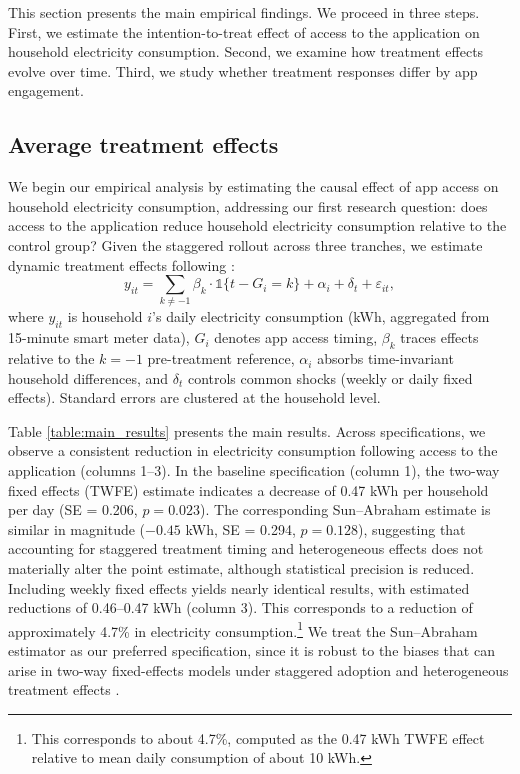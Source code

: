 This section presents the main empirical findings. We proceed in three steps. First, we estimate the intention-to-treat effect of access to the application on household electricity consumption. Second, we examine how treatment effects evolve over time. Third, we study whether treatment responses differ by app engagement.


\subsection{Average treatment effects}

We begin our empirical analysis by estimating the causal effect of app access on household electricity consumption, addressing our first research question: does access to the application reduce household electricity consumption relative to the control group?
Given the staggered rollout across three tranches, we estimate dynamic treatment effects following \citet{sunEstimatingDynamicTreatment2021}:
\[
y_{it} = \sum_{k \neq -1} \beta_k \cdot \mathbb{1}\{t - G_i = k\} + \alpha_i + \delta_t + \varepsilon_{it},
\]
where $y_{it}$ is household $i$'s daily electricity consumption (kWh, aggregated from 15-minute smart meter data), $G_i$ denotes app access timing, $\beta_k$ traces effects relative to the $k=-1$ pre-treatment reference, $\alpha_i$ absorbs time-invariant household differences, and $\delta_t$ controls common shocks (weekly or daily fixed effects). Standard errors are clustered at the household level.

Table \ref{table:main_results} presents the main results. Across specifications, we observe a consistent reduction in electricity consumption following access to the application (columns 1--3). In the baseline specification (column 1), the two-way fixed effects (TWFE) estimate indicates a decrease of 0.47 kWh per household per day (SE = 0.206, $p = 0.023$). The corresponding Sun--Abraham estimate is similar in magnitude ($-0.45$ kWh, SE = 0.294, $p = 0.128$), suggesting that accounting for staggered treatment timing and heterogeneous effects does not materially alter the point estimate, although statistical precision is reduced. Including weekly fixed effects yields nearly identical results, with estimated reductions of 0.46--0.47 kWh (column 3). This corresponds to a reduction of approximately 4.7\% in electricity consumption.\footnote{This corresponds to about 4.7\%, computed as the 0.47 kWh TWFE effect relative to mean daily consumption of about 10 kWh.} We treat the Sun--Abraham estimator as our preferred specification, since it is robust to the biases that can arise in two-way fixed-effects models under staggered adoption and heterogeneous treatment effects \citep{sunEstimatingDynamicTreatment2021}.

